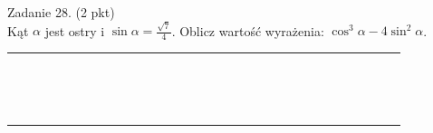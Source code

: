 \documentclass[10pt]{article}
\begin{document}
Zadanie 28. (2 pkt)\\
Kąt \(\alpha\) jest ostry i \(\sin \alpha=\frac{\sqrt{7}}{4}\). Oblicz wartość wyrażenia: \(\cos ^{3} \alpha-4 \sin ^{2} \alpha\).

\begin{center}
\begin{tabular}{|c|c|c|c|c|c|c|c|c|c|c|c|c|c|c|c|c|c|c|c|c|c|c|c|c|c|c|c|c|c|c|}
\hline
 &  &  &  &  &  &  &  &  &  &  &  &  &  &  &  &  &  &  &  &  &  &  &  &  &  &  &  &  &  &  \\
\hline
 &  &  &  &  &  &  &  &  &  &  &  &  &  &  &  &  &  &  &  &  &  &  &  &  &  &  &  &  &  &  \\
\hline
 &  &  &  &  &  &  &  &  &  &  &  &  &  &  &  &  &  &  &  &  &  &  &  &  &  &  &  &  &  &  \\
\hline
 &  &  &  &  &  &  &  &  &  &  &  &  &  &  &  &  &  &  &  &  &  &  &  &  &  &  &  &  &  &  \\
\hline
 &  &  &  &  &  &  &  &  &  &  &  &  &  &  &  &  &  &  &  &  &  &  &  &  &  &  &  &  &  &  \\
\hline
 &  &  &  &  &  &  &  &  &  &  &  &  &  &  &  &  &  &  &  &  &  &  &  &  &  &  &  &  &  &  \\
\hline
 &  &  &  &  &  &  &  &  &  &  &  &  &  &  &  &  &  &  &  &  &  &  &  &  &  &  &  &  &  &  \\
\hline
 &  &  &  &  &  &  &  &  &  &  &  &  &  &  &  &  &  &  &  &  &  &  &  &  &  &  &  &  &  &  \\
\hline
 &  &  &  &  &  &  &  &  &  &  &  &  &  &  &  &  &  &  &  &  &  &  &  &  &  &  &  &  &  &  \\
\hline
 &  &  &  &  &  &  &  &  &  &  &  &  &  &  &  &  &  &  &  &  &  &  &  &  &  &  &  &  &  &  \\
\hline
 &  &  &  &  &  &  &  &  &  &  &  &  &  &  &  &  &  &  &  &  &  &  &  &  &  &  &  &  &  &  \\
\hline
 &  &  &  &  &  &  &  &  &  &  &  &  &  &  &  &  &  &  &  &  &  &  &  &  &  &  &  &  &  &  \\
\hline
 &  &  &  &  &  &  &  &  &  &  &  &  &  &  &  &  &  &  &  &  &  &  &  &  &  &  &  &  &  &  \\
\hline
 &  &  &  &  &  &  &  &  &  &  &  &  &  &  &  &  &  &  &  &  &  &  &  &  &  &  &  &  &  &  \\
\hline
 &  &  &  &  &  &  &  &  &  &  &  &  &  &  &  &  &  &  &  &  &  &  &  &  &  &  &  &  &  &  \\
\hline
 &  &  &  &  &  &  &  &  &  &  &  &  &  &  &  &  &  &  &  &  &  &  &  &  &  &  &  &  &  &  \\

\end{tabular}
\end{center}
\end{document}
